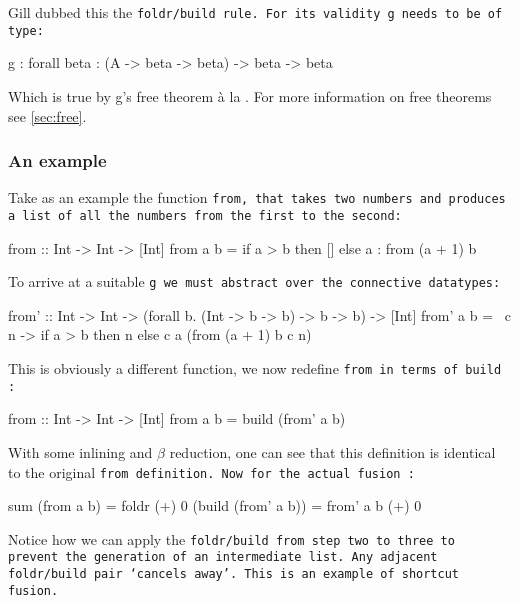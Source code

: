 Gill dubbed this the \tt{foldr/build} rule. For its validity \tt{g} needs to be of type:
\begin{code}
g : forall beta : (A -> beta -> beta) -> beta -> beta
\end{code}
Which is true by g's free theorem \`a la \cite{Wadler1989}. For more information on free theorems see \autoref{sec:free}.

\subsubsection{An example}
Take as an example the function \tt{from}, that takes two numbers and produces a list of all the numbers from the first to the second:
\begin{code}
from :: Int -> Int -> [Int]
from a b = if a > b
           then []
           else a : from (a + 1) b
\end{code}
To arrive at a suitable \tt{g} we must abstract over the connective datatypes:
\begin{code}
from' :: Int -> Int -> (forall b. (Int -> b -> b) -> b -> b) -> [Int] 
from' a b = \ c n  -> if a > b
                      then n
                      else c a (from (a + 1) b c n)
\end{code}
This is obviously a different function, we now redefine \tt{from} in terms of \tt{build} \citep{Gill1993}:
\begin{code}
from :: Int -> Int -> [Int]
from a b = build (from' a b)
\end{code}
With some inlining and $\beta$ reduction, one can see that this definition is identical to the original \tt{from} definition.
Now for the actual fusion \citep{Gill1993}:
\begin{code}
sum (from a b)
  = foldr (+) 0 (build (from' a b))
  = from' a b (+) 0
\end{code}
Notice how we can apply the \tt{foldr/build} from step two to three to prevent the generation of an intermediate list.
Any adjacent \tt{foldr/build} pair `cancels away'.
This is an example of shortcut fusion.

